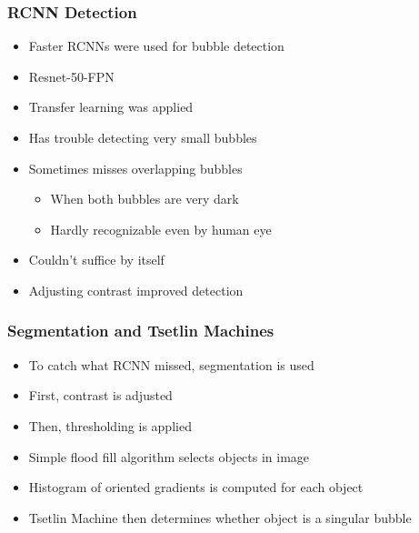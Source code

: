 \documentclass{beamer}
\begin{document}
\begin{frame}
    \frametitle{RCNN Detection}

    \begin{itemize}
        \item Faster RCNNs were used for bubble detection
        \item Resnet-50-FPN
        \item Transfer learning was applied
        \item Has trouble detecting very small bubbles
        \item Sometimes misses overlapping bubbles
        \begin{itemize}
            \item When both bubbles are very dark
            \item Hardly recognizable even by human eye
        \end{itemize}
        \item Couldn't suffice by itself
        \item Adjusting contrast improved detection
    \end{itemize}

\end{frame}

\begin{frame}
    \frametitle{Segmentation and Tsetlin Machines}

    \begin{itemize}
        \item To catch what RCNN missed, segmentation is used
        \item First, contrast is adjusted
        \item Then, thresholding is applied
        \item Simple flood fill algorithm selects objects in image
        \item Histogram of oriented gradients is computed for each object
        \item Tsetlin Machine then determines whether object is a singular bubble
    \end{itemize}

\end{frame}
\end{document}
